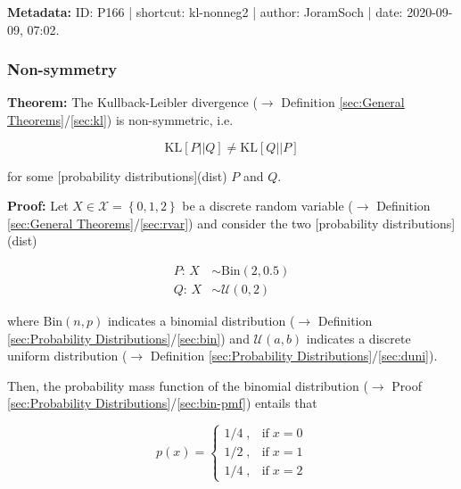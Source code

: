 \documentclass[a4paper,12pt,twoside]{book}
\begin{document}
\vspace{1em}
\textbf{Metadata:} ID: P166 | shortcut: kl-nonneg2 | author: JoramSoch | date: 2020-09-09, 07:02.
\vspace{1em}



\subsubsection[\textbf{Non-symmetry}]{Non-symmetry} \label{sec:kl-nonsymm}
\setcounter{equation}{0}

\textbf{Theorem:}  The Kullback-Leibler divergence ($\rightarrow$ Definition \ref{sec:General Theorems}/\ref{sec:kl}) is non-symmetric, i.e.

\begin{equation} \label{eq:kl-nonsymm-KL-nonsymm}
\mathrm{KL}[P||Q] \neq \mathrm{KL}[Q||P]
\end{equation}

for some [probability distributions](dist) $P$ and $Q$.


\vspace{1em}
\textbf{Proof:} Let $X \in \mathcal{X} = \left\lbrace 0, 1, 2 \right\rbrace$ be a discrete random variable ($\rightarrow$ Definition \ref{sec:General Theorems}/\ref{sec:rvar}) and consider the two [probability distributions](dist)

\begin{equation} \label{eq:kl-nonsymm-P-Q}
\begin{split}
P : \, X &\sim \mathrm{Bin}(2, 0.5) \\
Q : \, X &\sim \mathcal{U}(0, 2)
\end{split}
\end{equation}

where $\mathrm{Bin}(n, p)$ indicates a binomial distribution ($\rightarrow$ Definition \ref{sec:Probability Distributions}/\ref{sec:bin}) and $\mathcal{U}(a, b)$ indicates a discrete uniform distribution ($\rightarrow$ Definition \ref{sec:Probability Distributions}/\ref{sec:duni}).

Then, the probability mass function of the binomial distribution ($\rightarrow$ Proof \ref{sec:Probability Distributions}/\ref{sec:bin-pmf}) entails that

\begin{equation} \label{eq:kl-nonsymm-p(x)}
p(x) = \left\{
\begin{array}{rl}
1/4 \; , & \text{if} \; x = 0 \\
1/2 \; , & \text{if} \; x = 1 \\
1/4 \; , & \text{if} \; x = 2
\end{array}
\right.
\end{equation}
\end{document}
